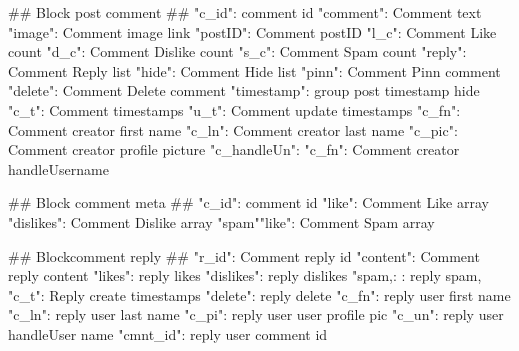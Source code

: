 ## Block post comment ##
"c_id": comment id
"comment": Comment text
"image": Comment image link
"postID": Comment postID 
"l_c": Comment  Like count
"d_c": Comment  Dislike count
"s_c": Comment Spam count
"reply": Comment Reply list
"hide": Comment  Hide list
"pinn": Comment Pinn comment
"delete": Comment Delete comment
"timestamp": group post timestamp hide
"c_t":  Comment timestamps
"u_t": Comment update timestamps
"c_fn": Comment creator first name
"c_ln": Comment creator last name
"c_pic": Comment creator profile picture
"c_handleUn": "c_fn": Comment creator handleUsername


## Block comment meta ##
"c_id": comment id
"like": Comment  Like array
"dislikes": Comment  Dislike array
"spam""like": Comment Spam array



## Blockcomment reply ##
"r_id": Comment reply id
"content": Comment reply content
"likes": reply likes
"dislikes": reply dislikes
"spam,: : reply spam,
"c_t": Reply create timestamps
"delete": reply delete
"c_fn": reply user first name
"c_ln": reply user last name
"c_pi": reply user  user profile pic
"c_un": reply user handleUser name
"cmnt_id": reply user comment id


